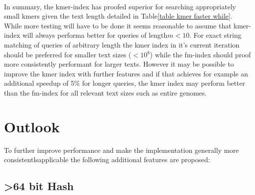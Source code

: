 ~

In summary, the kmer-index has proofed superior for searching appropriately
small kmers given the text length detailed in Table\ref{table kmer faster while}.
While more testing will have to be done it seems reasonable to assume
that kmer-index will always performa better for queries of length$m<10$.
For exact string matching of queries of arbitrary length the kmer
index in it's current iteration should be preferred for smaller text
sizes ($<10{{}^8}$) while the fm-index should proof more consistently
performant for larger texts. However it may be possible to improve
the kmer index with further features and if that achieves for example
an additional speedup of 5\% for longer queries, the kmer index may
perform better than the fm-index for all relevant text sizes such
as entire genomes.

\section{Outlook}

To further improve performance and make the implementation generally
more consistentlsapplicable the following additional features are
proposed:

\subsection{>64 bit Hash}

